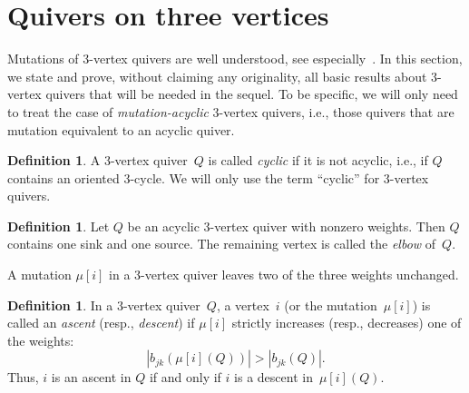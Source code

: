 \documentclass[11pt, letterpaper]{amsart}
\theoremstyle{definition}
\newtheorem{definition}[theorem]{Definition}
\numberwithin{equation}{section}
\newcommand{\T}[2]{\mu[#1](#2)} %
\begin{document}
\newpage

\section{Quivers on three vertices}
\label{sec:3Vertex}

Mutations of 3-vertex quivers are well understood, see especially~\cite{ABBS}.
In this section, we state and prove, without claiming any originality, all basic results about 3-vertex quivers that will be needed in the sequel.
To be specific, we will only need to treat the case of \emph{mutation-acyclic} 3-vertex quivers,
i.e., those quivers that are mutation equivalent to an acyclic quiver. 

\begin{definition}
\label{def:cyclic-quiver}
A 3-vertex quiver~$Q$ is called \emph{cyclic} %
if it is not acyclic, i.e., if $Q$ contains an oriented 3-cycle. 
We will only use the term ``cyclic'' for 3-vertex quivers.
\end{definition}

\begin{definition}
\label{def:elbow}
Let $Q$ be an acyclic 3-vertex quiver with nonzero weights. 
Then $Q$ contains one sink and one source.
The remaining vertex is called the \emph{elbow} of~$Q$. 
\end{definition}

A mutation $\mu[i]$ in a 3-vertex quiver leaves two of the three weights unchanged. 

\begin{definition}
\label{def:ascent}
In a 3-vertex quiver~$Q$, 
a vertex~$i$ (or the mutation~$\mu[i]$)
is called an \emph{ascent} (resp., \emph{descent})
if $\mu[i]$ strictly increases (resp., decreases) one of the weights: 
\[
|b_{jk}(\T{i}{Q})| > |b_{jk}(Q)|. 
\]
Thus, $i$ is an ascent in $Q$ if and only if $i$ is a descent in~$\T{i}{Q}$. 
\end{definition}
\end{document}
